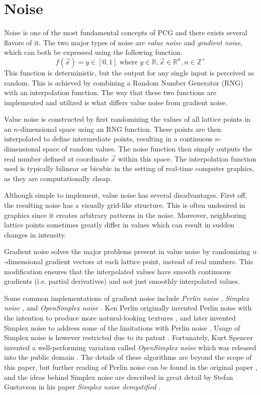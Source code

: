 \section{Noise}

Noise is one of the most fundamental concepts of PCG and there exists several flavors of it.
The two major types of noise are \textit{value noise} and \textit{gradient noise}, which can both be expressed using the following function.
$$
  f(\vec x) = y \in [0, 1] \text{ where }
  y \in \mathbb{R},
  \vec x \in \mathbb{R}^n,
  n \in \mathbb{Z}^+
$$
This function is deterministic, but the output for any single input is perceived as random.
This is achieved by combining a Random Number Generator (RNG) with an interpolation function.
The way that these two functions are implemented and utilized is what differs value noise from gradient noise.

Value noise is constructed by first randomizing the values of all lattice points in an $n$-dimensional space using an RNG function.
These points are then interpolated to define intermediate points, resulting in a continuous $n$-dimensional space of random values.
The noise function then simply outputs the real number defined at coordinate $\vec x$ within this space.
The interpolation function used is typically bilinear or bicubic in the setting of real-time computer graphics, as they are computationally cheap.

Although simple to implement, value noise has several disadvantages.
First off, the resulting noise has a visually grid-like structure.
This is often undesired in graphics since it creates arbitrary patterns in the noise.
Moreover, neighboring lattice points sometimes greatly differ in values which can result in sudden changes in intensity.

Gradient noise solves the major problems present in value noise by randomizing $n$-dimensional gradient vectors at each lattice point, instead of real numbers.
This modification ensures that the interpolated values have smooth continuous gradients (i.e. partial derivatives) and not just smoothly interpolated values.

Some common implementations of gradient noise include \textit{Perlin noise} \cite{perlin_noise} \cite{perlin_noise2}, \textit{Simplex noise} \cite{simplex_noise}, and \textit{OpenSimplex noise} \cite{opensimplex_noise_blog} \cite{opensimplex_noise_code}.
Ken Perlin originally invented Perlin noise with the intention to produce more natural-looking textures \cite{perlin_noise}, and later invented Simplex noise to address some of the limitations with Perlin noise \cite{simplex_noise}.
Usage of Simplex noise is however restricted due to its patent \cite{opensimplex_noise_patent}.
Fortunately, Kurt Spencer invented a well-performing variation called \textit{OpenSimplex noise} which was released into the public domain \cite{opensimplex_noise_blog} \cite{opensimplex_noise_code}.
The details of these algorithms are beyond the scope of this paper, but further reading of Perlin noise can be found in the original paper \cite{perlin_noise}, and the ideas behind Simplex noise are described in great detail by Stefan Gustavson in his paper \textit{Simplex noise demystified} \cite{simplex_noise_explained}.

